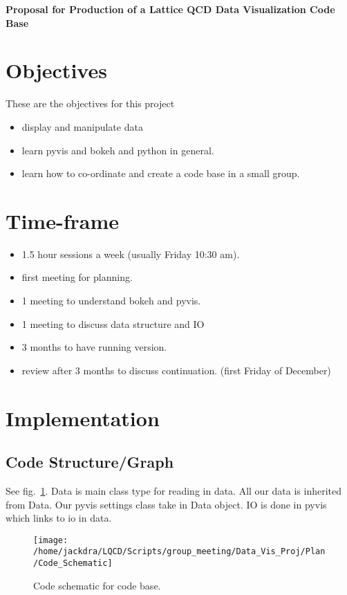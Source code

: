 \documentclass{article}
\begin{document}
{\centering \bf \LARGE Proposal for Production of a Lattice QCD Data Visualization Code Base}

\section{Objectives}
These are the objectives for this project
\begin{itemize}
  \item display and manipulate data
  \item learn pyvis and bokeh and python in general.
  \item learn how to co-ordinate and create a code base in a small group.
\end{itemize}

\section{Time-frame}
\begin{itemize}
  \item 1.5 hour sessions a week (usually Friday 10:30 am).
  \item first meeting for planning.
  \item 1 meeting to understand bokeh and pyvis.
  \item 1 meeting to discuss data structure and IO
  \item 3 months to have running version.
  \item review after 3 months to discuss continuation. (first Friday of December)
\end{itemize}



\section{Implementation}

\subsection{Code Structure/Graph}
See fig.~\ref{code_sch}. Data is main class type for reading in data. All our data is inherited from Data.
Our pyvis settings class take in Data object. IO is done in pyvis which links to io in data.
\begin{figure}
  \centering
  \texttt{[image: /home/jackdra/LQCD/Scripts/group\_meeting/Data\_Vis\_Proj/Plan/Code\_Schematic]}
  \caption{\label{code_sch}Code schematic for code base. }
\end{figure}
\end{document}
